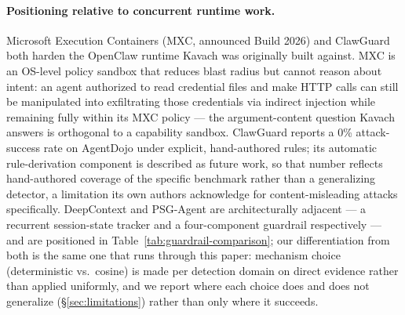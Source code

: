 \documentclass[sigconf,anonymous,review]{acmart}
\begin{document}
\paragraph{Positioning relative to concurrent runtime work.} Microsoft
Execution Containers (MXC, announced Build 2026) and ClawGuard
\cite{clawguard2026} both harden the OpenClaw runtime Kavach was originally
built against. MXC is an OS-level policy sandbox that reduces blast radius
but cannot reason about intent: an agent authorized to read credential files
and make HTTP calls can still be manipulated into exfiltrating those
credentials via indirect injection while remaining fully within its MXC
policy --- the argument-content question Kavach answers is orthogonal to a
capability sandbox. ClawGuard reports a 0\% attack-success rate on AgentDojo
under explicit, hand-authored rules; its automatic rule-derivation component
is described as future work, so that number reflects hand-authored coverage
of the specific benchmark rather than a generalizing detector, a limitation
its own authors acknowledge for content-misleading attacks specifically.
DeepContext \cite{albrethsen2026deepcontext} and PSG-Agent \cite{psgagent2026}
are architecturally adjacent --- a recurrent session-state tracker and a
four-component guardrail respectively --- and are positioned in
Table~\ref{tab:guardrail-comparison}; our differentiation from both is the
same one that runs through this paper: mechanism choice (deterministic vs.\
cosine) is made per detection domain on direct evidence rather than applied
uniformly, and we report where each choice does and does not generalize
(\S\ref{sec:limitations}) rather than only where it succeeds.


%
\end{document}
